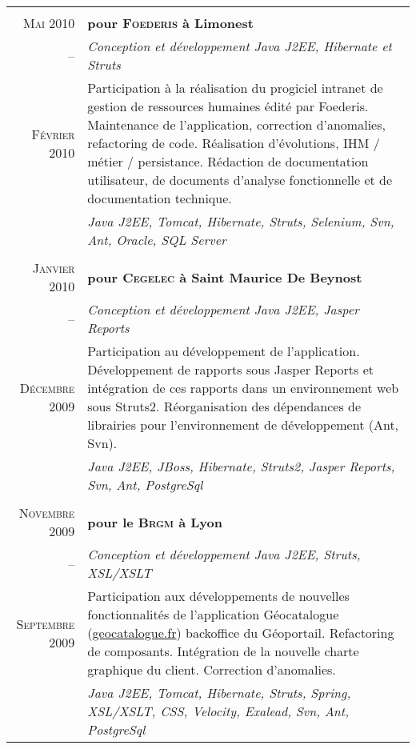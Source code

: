 \documentclass[a4paper,10pt]{article}
\begin{document}
\begin{supertabular}{r|p{11cm}}
   \\
  \textsc{Mai 2010} & \textbf{pour \textsc{Foederis} à Limonest} \\
  -- & \emph{Conception et développement Java J2EE, Hibernate et Struts} \\
  \footnotesize{\textsc{Février 2010}} & \footnotesize{Participation à la réalisation du progiciel intranet de gestion de ressources humaines édité par Foederis. Maintenance de l’application, correction d’anomalies, refactoring de code. Réalisation d’évolutions, IHM / métier / persistance. Rédaction de documentation utilisateur, de documents d’analyse fonctionnelle et de documentation technique.} \\
  & \emph{Java J2EE, Tomcat, Hibernate, Struts, Selenium, Svn, Ant, Oracle, SQL Server} \\


   \\
  \textsc{Janvier 2010} & \textbf{pour \textsc{Cegelec} à Saint Maurice De Beynost} \\
  -- & \emph{Conception et développement Java J2EE, Jasper Reports} \\
  \footnotesize{\textsc{Décembre 2009}}  & \footnotesize{Participation au développement de l’application. Développement de rapports sous Jasper Reports et intégration de ces rapports dans un environnement web sous Struts2. Réorganisation des dépendances de librairies pour l’environnement de développement (Ant, Svn).} \\
  & \emph{Java J2EE, JBoss, Hibernate, Struts2, Jasper Reports, Svn, Ant, PostgreSql} \\


   \\
  \textsc{Novembre 2009} & \textbf{pour le \textsc{Brgm} à Lyon} \\
  -- & \emph{Conception et développement Java J2EE, Struts, XSL/XSLT} \\
  \footnotesize{\textsc{Septembre 2009}} & \footnotesize{Participation aux développements de nouvelles fonctionnalités de l’application Géocatalogue (\href{http://www.geocatalogue.fr}{geocatalogue.fr}) backoffice du Géoportail. Refactoring de composants. Intégration de la nouvelle charte graphique du client. Correction d’anomalies.} \\
  & \emph{Java J2EE, Tomcat, Hibernate, Struts, Spring, XSL/XSLT, CSS, Velocity, Exalead, Svn, Ant, PostgreSql} \\



\end{supertabular}
\end{document}
